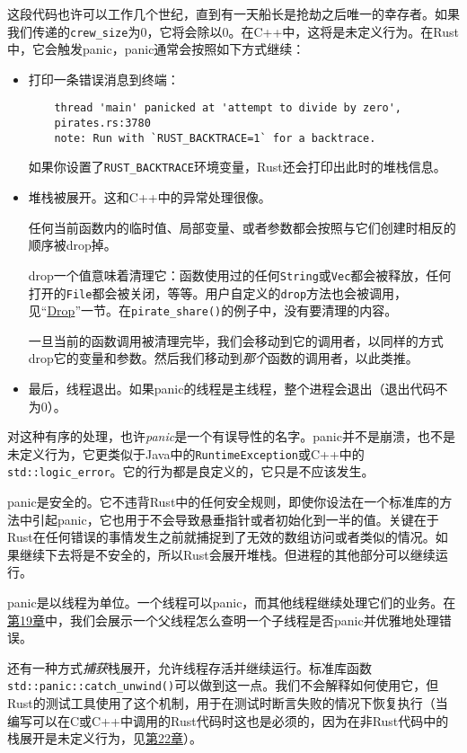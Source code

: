 这段代码也许可以工作几个世纪，直到有一天船长是抢劫之后唯一的幸存者。如果我们传递的\texttt{crew\_size}为0，它将会除以0。在C++中，这将是未定义行为。在Rust中，它会触发panic，panic通常会按照如下方式继续：
\begin{itemize}
    \item 打印一条错误消息到终端：
    \begin{verbatim}
    thread 'main' panicked at 'attempt to divide by zero',
    pirates.rs:3780
    note: Run with `RUST_BACKTRACE=1` for a backtrace.
    \end{verbatim}

    如果你设置了\texttt{RUST\_BACKTRACE}环境变量，Rust还会打印出此时的堆栈信息。

    \item 堆栈被展开。这和C++中的异常处理很像。
    
    任何当前函数内的临时值、局部变量、或者参数都会按照与它们创建时相反的顺序被drop掉。

    drop一个值意味着清理它：函数使用过的任何\texttt{String}或\texttt{Vec}都会被释放，任何打开的\texttt{File}都会被关闭，等等。用户自定义的\texttt{drop}方法也会被调用，见“\hyperref[drop]{Drop}”一节。在\texttt{pirate\_share()}的例子中，没有要清理的内容。

    一旦当前的函数调用被清理完毕，我们会移动到它的调用者，以同样的方式drop它的变量和参数。然后我们移动到\emph{那个}函数的调用者，以此类推。

    \item 最后，线程退出。如果panic的线程是主线程，整个进程会退出（退出代码不为0）。
\end{itemize}

对这种有序的处理，也许\emph{panic}是一个有误导性的名字。panic并不是崩溃，也不是未定义行为，它更类似于Java中的\texttt{RuntimeException}或C++中的\texttt{std::logic\_error}。它的行为都是良定义的，它只是不应该发生。

panic是安全的。它不违背Rust中的任何安全规则，即使你设法在一个标准库的方法中引起panic，它也用于不会导致悬垂指针或者初始化到一半的值。关键在于Rust在任何错误的事情发生之前就捕捉到了无效的数组访问或者类似的情况。如果继续下去将是不安全的，所以Rust会展开堆栈。但进程的其他部分可以继续运行。

panic是以线程为单位。一个线程可以panic，而其他线程继续处理它们的业务。在\hyperref[ch19]{第19章}中，我们会展示一个父线程怎么查明一个子线程是否panic并优雅地处理错误。

还有一种方式\emph{捕获}栈展开，允许线程存活并继续运行。标准库函数\texttt{std::panic::catch\_unwind()}可以做到这一点。我们不会解释如何使用它，但Rust的测试工具使用了这个机制，用于在测试时断言失败的情况下恢复执行（当编写可以在C或C++中调用的Rust代码时这也是必须的，因为在非Rust代码中的栈展开是未定义行为，见\hyperref[ch22]{第22章}）。

